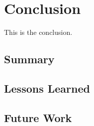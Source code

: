 \section{Conclusion}

This is the conclusion.

\subsection{Summary}

\subsection{Lessons Learned}

\subsection{Future Work}